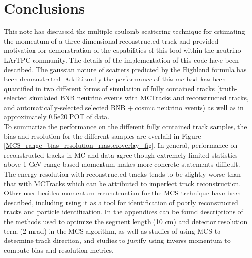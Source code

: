 \section{Conclusions}\label{conclusion_section}

This note has discussed the multiple coulomb scattering technique for estimating the momentum of a three dimensional reconstructed track and provided motivation for demonstration of the capabilities of this tool within the neutrino LArTPC community. The details of the implementation of this code have been described. The gaussian nature of scatters predicted by the Highland formula has been demonstrated. Additionally the performance of this method has been quantified in two different forms of simulation of fully contained tracks (truth-selected simulated BNB neutrino events with {\sc MCTracks} and reconstructed tracks, and automatically-selected selected BNB + cosmic neutrino events) as well as in approximately 0.5e20 POT of {\ub} data.\\

To summarize the performance on the different fully contained track samples, the bias and resolution for the different samples are overlaid in Figure \ref{MCS_range_bias_resolution_masteroverlay_fig}. In general, performance on reconstructed tracks in MC and data agree though extremely limited statistics above 1 GeV range-based momentum makes more concrete statements difficult. The energy resolution with reconstructed tracks tends to be slightly worse than that with {\sc MCTracks} which can be attributed to imperfect track reconstruction.\\

Other uses besides momentum reconstruction for the MCS technique have been described, including using it as a tool for identification of poorly reconstructed tracks and particle identification. In the appendices can be found descriptions of the methods used to optimize the segment length (10 cm) and detector resolution term (2 mrad) in the MCS algorithm, as well as studies of using MCS to determine track direction, and studies to justify using inverse momentum to compute bias and resolution metrics.


